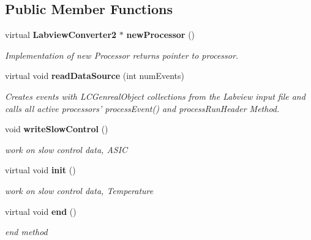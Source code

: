 \subsection*{Public Member Functions}
\begin{DoxyCompactItemize}
\item 
virtual {\bf LabviewConverter2} $\ast$ {\bf newProcessor} ()\label{classmarlin_1_1LabviewConverter2_a675d56e8eeba4d2ad85e8ced3884b090}

\begin{DoxyCompactList}\small\item\em Implementation of new Processor returns pointer to processor. \item\end{DoxyCompactList}\item 
virtual void {\bf readDataSource} (int numEvents)\label{classmarlin_1_1LabviewConverter2_a1548f59e1de895ed0d6ca0e749dd0261}

\begin{DoxyCompactList}\small\item\em Creates events with LCGenrealObject collections from the Labview input file and calls all active processors' processEvent() and processRunHeader Method. \item\end{DoxyCompactList}\item 
void {\bf writeSlowControl} ()\label{classmarlin_1_1LabviewConverter2_a55ebf8a0b8a4d3227c106937dba96a39}

\begin{DoxyCompactList}\small\item\em work on slow control data, ASIC \item\end{DoxyCompactList}\item 
virtual void {\bf init} ()
\begin{DoxyCompactList}\small\item\em work on slow control data, Temperature \item\end{DoxyCompactList}\item 
virtual void {\bf end} ()\label{classmarlin_1_1LabviewConverter2_a3afe7b429e0851d276e01ead2115d848}

\begin{DoxyCompactList}\small\item\em end method \item\end{DoxyCompactList}\end{DoxyCompactItemize}
